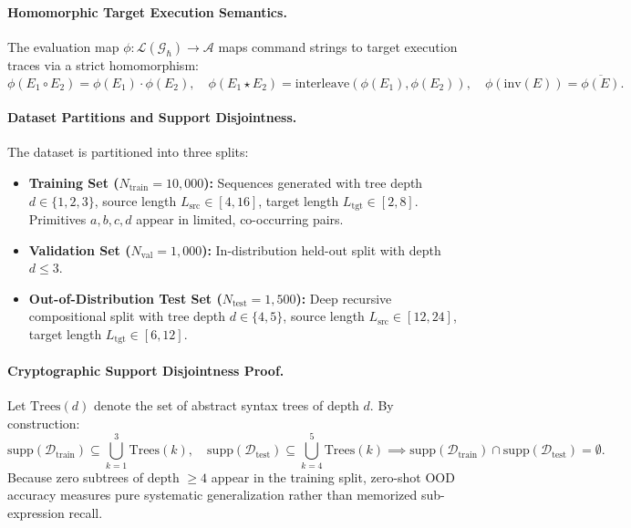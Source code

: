 \documentclass{article}
\theoremstyle{plain}
\theoremstyle{definition}
\begin{document}
\paragraph{Homomorphic Target Execution Semantics.}
The evaluation map $\phi: \mathcal{L}(\mathcal{G}_{\hbar}) \to \mathcal{A}$ maps command strings to target execution traces via a strict homomorphism:
\begin{equation}
    \phi(E_1 \circ E_2) = \phi(E_1) \cdot \phi(E_2), \quad \phi(E_1 \star E_2) = \text{interleave}(\phi(E_1), \phi(E_2)), \quad \phi(\text{inv}(E)) = \overline{\phi(E)}.
\end{equation}

\paragraph{Dataset Partitions and Support Disjointness.}
The dataset is partitioned into three splits:
\begin{itemize}[noitemsep]
    \item \textbf{Training Set ($N_{\text{train}} = 10{,}000$):} Sequences generated with tree depth $d \in \{1, 2, 3\}$, source length $L_{\text{src}} \in [4, 16]$, target length $L_{\text{tgt}} \in [2, 8]$. Primitives $a, b, c, d$ appear in limited, co-occurring pairs.
    \item \textbf{Validation Set ($N_{\text{val}} = 1{,}000$):} In-distribution held-out split with depth $d \le 3$.
    \item \textbf{Out-of-Distribution Test Set ($N_{\text{test}} = 1{,}500$):} Deep recursive compositional split with tree depth $d \in \{4, 5\}$, source length $L_{\text{src}} \in [12, 24]$, target length $L_{\text{tgt}} \in [6, 12]$.
\end{itemize}

\paragraph{Cryptographic Support Disjointness Proof.}
Let $\text{Trees}(d)$ denote the set of abstract syntax trees of depth $d$. By construction:
\begin{equation}
    \text{supp}(\mathcal{D}_{\text{train}}) \subseteq \bigcup_{k=1}^3 \text{Trees}(k), \quad \text{supp}(\mathcal{D}_{\text{test}}) \subseteq \bigcup_{k=4}^5 \text{Trees}(k) \implies \text{supp}(\mathcal{D}_{\text{train}}) \cap \text{supp}(\mathcal{D}_{\text{test}}) = \emptyset.
\end{equation}
Because zero subtrees of depth $\ge 4$ appear in the training split, zero-shot OOD accuracy measures pure systematic generalization rather than memorized sub-expression recall.
\end{document}
